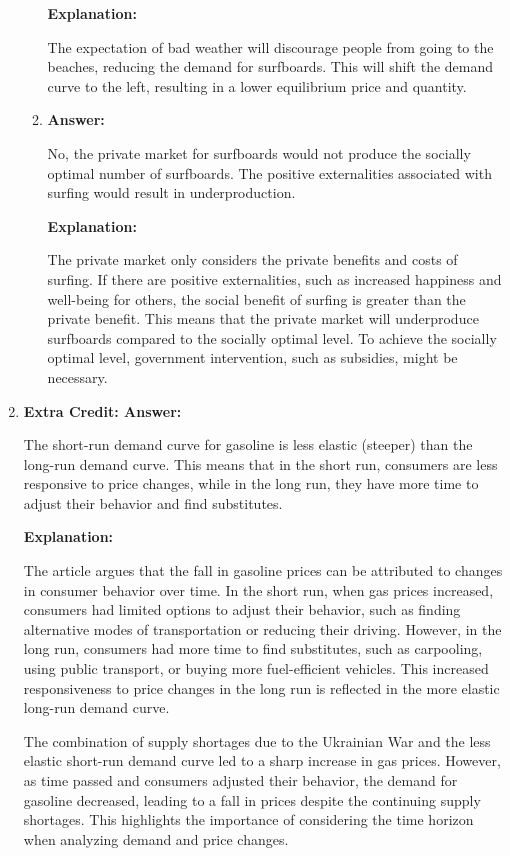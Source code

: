 \documentclass{article}
\begin{document}
\begin{enumerate}
\begin{enumerate}
                    \textbf{Explanation:}

                    The expectation of bad weather will discourage people from going to the beaches, reducing the demand for surfboards. This will shift the demand curve to the left, resulting in a lower equilibrium price and quantity.

              \item \textbf{Answer:}

                    No, the private market for surfboards would not produce the socially optimal number of surfboards. The positive externalities associated with surfing would result in underproduction.

                    \textbf{Explanation:}

                    The private market only considers the private benefits and costs of surfing. If there are positive externalities, such as increased happiness and well-being for others, the social benefit of surfing is greater than the private benefit. This means that the private market will underproduce surfboards compared to the socially optimal level. To achieve the socially optimal level, government intervention, such as subsidies, might be necessary.
          \end{enumerate}

    \item \textbf{Extra Credit: Answer:}

          The short-run demand curve for gasoline is less elastic (steeper) than the long-run demand curve. This means that in the short run, consumers are less responsive to price changes, while in the long run, they have more time to adjust their behavior and find substitutes.

          \textbf{Explanation:}

          The article argues that the fall in gasoline prices can be attributed to changes in consumer behavior over time. In the short run, when gas prices increased, consumers had limited options to adjust their behavior, such as finding alternative modes of transportation or reducing their driving. However, in the long run, consumers had more time to find substitutes, such as carpooling, using public transport, or buying more fuel-efficient vehicles. This increased responsiveness to price changes in the long run is reflected in the more elastic long-run demand curve.

          The combination of supply shortages due to the Ukrainian War and the less elastic short-run demand curve led to a sharp increase in gas prices. However, as time passed and consumers adjusted their behavior, the demand for gasoline decreased, leading to a fall in prices despite the continuing supply shortages. This highlights the importance of considering the time horizon when analyzing demand and price changes.
\end{enumerate}
\end{document}

